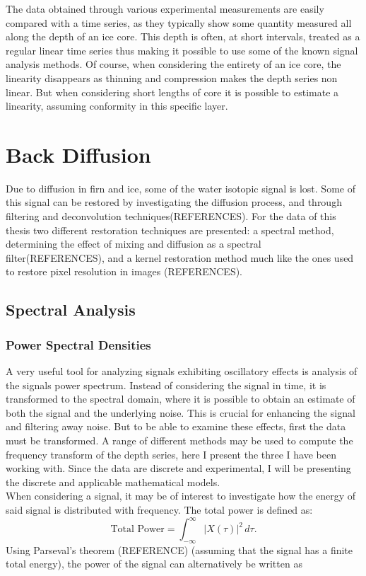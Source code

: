 \documentclass[../../CompleteThesis/Complete_1stDraft]{subfiles}
\begin{document}
The data obtained through various experimental measurements are easily compared with a time series, as they typically show some quantity measured all along the depth of an ice core. This depth is often, at short intervals, treated as a regular linear time series thus making it possible to use some of the known signal analysis methods. Of course, when considering the entirety of an ice core, the linearity disappears as thinning and compression makes the depth series non linear. But when considering short lengths of core it is possible to estimate a linearity, assuming conformity in this specific layer. 

\section[Back Diffusion][Back Diffusion]{Back Diffusion}
\label{Sec:SignalAnalysis_BackDiffusion}
Due to diffusion in firn and ice, some of the water isotopic signal is lost. Some of this signal can be restored by investigating the diffusion process, and through filtering and deconvolution techniques(REFERENCES).
For the data of this thesis two different restoration techniques are presented: a spectral method, determining the effect of mixing and diffusion as a spectral filter(REFERENCES), and a kernel restoration method much like the ones used to restore pixel resolution in images (REFERENCES). 
\subsection[Spectral Analysis][Spectral Analysis]{Spectral Analysis}
\label{Subsec:SignalAnalysis_BackDiffusion_SpectralAnalysis}
\subsubsection[PSD][PSD]{Power Spectral Densities}
\label{Subsubsec:SignalAnalysis_BackDiffusion_SpectralAnalysis_PSD}
A very useful tool for analyzing signals exhibiting oscillatory effects is analysis of the signals power spectrum. Instead of considering the signal in time, it is transformed to the spectral domain, where it is possible to obtain an estimate of both the signal and the underlying noise. This is crucial for enhancing the signal and filtering away noise. But to be able to examine these effects, first the data must be transformed. A range of different methods may be used to compute the frequency transform of the depth series, here I present the three I have been working with. Since the data are discrete and experimental, I will be presenting the discrete and applicable mathematical models.\\
When considering a signal, it may be of interest to investigate how the energy of said signal is distributed with frequency. The total power is defined as:
\begin{equation}
	\text{Total Power} = \int_{-\infty}^{\infty} |X(\tau)|^2 \, d\tau.
	\label{Eq:SignalEnergy}
\end{equation}
Using Parseval's theorem (REFERENCE) (assuming that the signal has a finite total energy), the power of the signal can alternatively be written as
\end{document}

